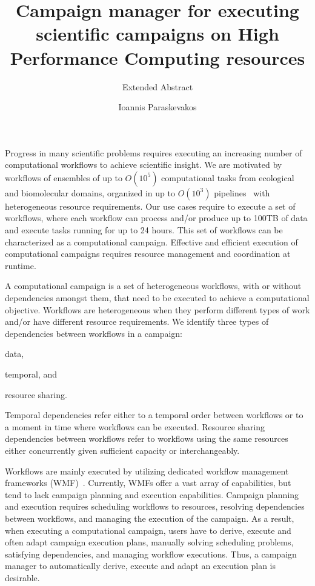 
\title{Campaign manager for executing scientific campaigns on High Performance 
Computing resources}
\subtitle{Extended Abstract}
\author{Ioannis Paraskevakos}
\vspace{-10ex}
\date{}

\maketitle
\vspace{-7ex}
Progress in many scientific problems requires executing an increasing number of 
computational workflows to achieve scientific insight. We are motivated by 
workflows of ensembles of up to $O(10^5)$ computational tasks from ecological 
and biomolecular domains, organized in up to $O(10^3)$ 
pipelines~\cite{rietmann2012forward, dakka2018high, paraskevakos2019workflow} 
with heterogeneous resource requirements. Our use cases require to execute a set of 
workflows, where each workflow can process and/or 
produce up to 100TB of data and execute tasks running for up to 24 hours. This set 
of workflows can be characterized as a computational campaign. Effective and 
efficient execution of computational campaigns requires resource management 
and coordination at runtime.

A computational campaign is a set of heterogeneous workflows, with or without 
dependencies amongst them, that need to be executed to achieve a computational objective. Workflows are heterogeneous 
when they perform different types of work and/or have different resource 
requirements. We identify three types of dependencies between workflows in a 
campaign:
\begin{inparaenum}[1)]
\item data, 
\item temporal, and 
\item resource sharing.
\end{inparaenum} 
Temporal dependencies refer either to a temporal order between workflows or to 
a moment in time where workflows can be executed. Resource sharing 
dependencies between workflows refer to workflows using the same resources 
either concurrently given sufficient capacity or interchangeably. 

Workflows are mainly executed by utilizing dedicated workflow management 
frameworks (WMF)~\cite{balasubramanian2018harnessing,deelman2015pegasus,ludascher2006scientific,rocklin2015dask,airflow}.
Currently, WMFs offer a vast array of capabilities, 
but tend to lack campaign planning and execution capabilities. Campaign planning 
and execution requires scheduling workflows to resources, resolving dependencies 
between workflows, and managing the execution of the campaign. As a result, 
when executing a computational campaign, users have to derive, execute and often 
adapt campaign execution plans, manually solving scheduling problems, satisfying 
dependencies, and managing workflow executions. Thus, a campaign manager to 
automatically derive, execute and adapt an execution plan is desirable.

